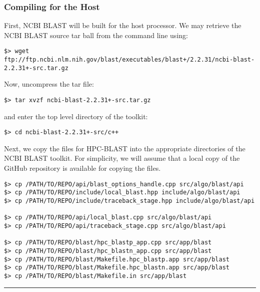 \documentclass[10pt]{article}
\begin{document}
\subsubsection{Compiling for the Host} \label{sssec:ncbi-host}
First, NCBI BLAST will be built for the host processor.  We may retrieve the NCBI BLAST source tar ball from the command line using:
\begin{verbatim}
$> wget ftp://ftp.ncbi.nlm.nih.gov/blast/executables/blast+/2.2.31/ncbi-blast-2.2.31+-src.tar.gz
\end{verbatim}
Now, uncompress the tar file:
\begin{verbatim}
$> tar xvzf ncbi-blast-2.2.31+-src.tar.gz
\end{verbatim}
\noindent and enter the top level directory of the toolkit:
\begin{verbatim}
$> cd ncbi-blast-2.2.31+-src/c++
\end{verbatim}
\noindent Next, we copy the files for HPC-BLAST into the appropriate directories of the NCBI BLAST toolkit.  
For simplicity, we will assume that a local copy of the
GitHub repository is available for copying the files.  
\footnotesize
\begin{verbatim}
$> cp /PATH/TO/REPO/api/blast_options_handle.cpp src/algo/blast/api
$> cp /PATH/TO/REPO/include/local_blast.hpp include/algo/blast/api
$> cp /PATH/TO/REPO/include/traceback_stage.hpp include/algo/blast/api

$> cp /PATH/TO/REPO/api/local_blast.cpp src/algo/blast/api
$> cp /PATH/TO/REPO/api/traceback_stage.cpp src/algo/blast/api

$> cp /PATH/TO/REPO/blast/hpc_blastp_app.cpp src/app/blast
$> cp /PATH/TO/REPO/blast/hpc_blastn_app.cpp src/app/blast
$> cp /PATH/TO/REPO/blast/Makefile.hpc_blastp.app src/app/blast
$> cp /PATH/TO/REPO/blast/Makefile.hpc_blastn.app src/app/blast
$> cp /PATH/TO/REPO/blast/Makefile.in src/app/blast
\end{verbatim}
\normalsize

\noindent \rule{16cm}{0.4pt}
\end{document}
